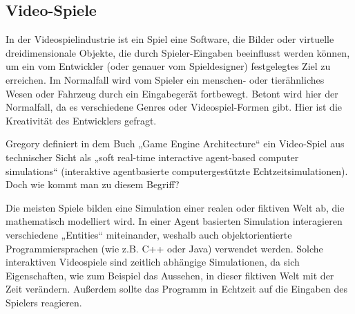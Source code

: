 \subsection{Video-Spiele}

In der Videospielindustrie ist ein Spiel eine Software, die Bilder oder virtuelle dreidimensionale Objekte, die durch Spieler-Eingaben beeinflusst werden können, um ein vom Entwickler (oder genauer vom Spieldesigner) festgelegtes Ziel zu erreichen. 
Im Normalfall wird vom Spieler ein menschen- oder tierähnliches Wesen oder Fahrzeug durch ein Eingabegerät fortbewegt. Betont wird hier der Normalfall, da es verschiedene Genres oder Videospiel-Formen gibt. Hier ist die Kreativität des Entwicklers gefragt.

Gregory definiert in dem Buch „Game Engine Architecture“ ein Video-Spiel aus technischer Sicht als „soft real-time interactive agent-based computer simulations“ \cite{gea} (interaktive agentbasierte computergestützte Echtzeitsimulationen).
Doch wie kommt man zu diesem Begriff?

Die meisten Spiele bilden eine Simulation einer realen oder fiktiven Welt ab, die mathematisch modelliert wird. In einer Agent basierten Simulation interagieren verschiedene „Entities“ miteinander, weshalb auch objektorientierte Programmiersprachen (wie z.B. C++ oder Java) verwendet werden.
Solche interaktiven Videospiele sind zeitlich abhängige Simulationen, da sich Eigenschaften, wie zum Beispiel das Aussehen, in dieser fiktiven Welt mit der Zeit verändern. Außerdem sollte das Programm in Echtzeit auf die Eingaben des Spielers reagieren.
